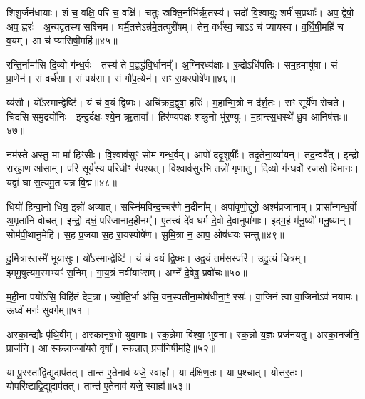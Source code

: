 शिशु॒र्जन॑धायाः। 
शं च॒ वक्षि॒ परि॑ च॒ वक्षि॑। 
चतुः॑ स्रक्ति॒र्नाभि॑र्\mbox{}ऋ॒तस्य॑। 
सदो॑ वि॒श्वायुः॒ शर्म॑ स॒प्रथाः᳚। 
अप॒ द्वेषो॒ अप॒ ह्वरः॑। 
अ॒न्यद्व्र॑तस्य सश्चिम। 
घर्मै॒तत्तेऽन्न॑मे॒तत्पुरी॑षम्। 
तेन॒ वर्ध॑स्व॒ चाऽऽ च॑ प्यायस्व। 
व॒र्धि॒षी॒महि॑ च व॒यम्। 
आ च॑ प्यासिषी॒महि॑॥४५॥

रन्ति॒र्नामा॑सि दि॒व्यो ग॑न्ध॒र्वः। 
तस्य॑ ते प॒द्वद्ध॑वि॒र्धानम्᳚। 
अ॒ग्निरध्य॑क्षाः। 
रु॒द्रोऽधि॑पतिः। 
सम॒हमायु॑षा। 
सं प्रा॒णेन॑। 
सं वर्च॑सा। 
सं पय॑सा। 
सं गौ॑प॒त्येन॑। 
सꣳ रा॒यस्पोषे॑ण॥४६॥

व्य॑सौ। 
यो᳚ऽस्मान्द्वेष्टि॑। 
यं च॑ व॒यं द्वि॒ष्मः। 
अचि॑क्रद॒द्वृषा॒ हरिः॑। 
म॒हान्मि॒त्रो न द॑र्\mbox{}श॒तः। 
सꣳ सूर्ये॑ण रोचते। 
चिद॑सि समु॒द्रयो॑निः। 
इन्दु॒र्दक्षः॑ श्ये॒न ऋ॒तावा᳚। 
हिर॑ण्यपक्षः  शकु॒नो भु॑र॒ण्युः। 
म॒हान्त्स॒धस्थे᳚ ध्रु॒व आनिष॑त्तः॥४७॥

नम॑स्ते अस्तु॒ मा मा॑ हिꣳसीः। 
वि॒श्वाव॑सुꣳ सोम गन्ध॒र्वम्। 
आपो॑ ददृ॒शुषीः᳚। 
तदृ॒तेना॒व्या॑यन्। 
तद॒न्ववै᳚त्। 
इन्द्रो॑ रारहा॒ण आ॑साम्। 
परि॒ सूर्य॑स्य परि॒धीꣳ र॑पश्यत्। 
वि॒श्वाव॑सुर॒भि तन्नो॑ गृणातु। 
दि॒व्यो ग॑न्ध॒र्वो रज॑सो वि॒मानः॑। 
यद्वा॑ घा स॒त्यमु॒त यन्न वि॒द्म॥४८॥

धियो॑ हिन्वा॒नो धिय॒ इन्नो॑ अव्यात्। 
सस्नि॑मविन्द॒च्चर॑णे न॒दीना᳚म्। 
अपा॑वृणो॒द्दुरो॒ अश्म॑व्रजानाम्। 
प्रासा᳚न्गन्ध॒र्वो अ॒मृता॑नि वोचत्। 
इन्द्रो॒ दक्षं॒ परि॑जानाद॒हीनम्᳚। 
ए॒तत्त्वं दे॑व घर्म दे॒वो दे॒वानुपा॑गाः। 
इ॒दम॒हं म॑नु॒ष्यो॑ मनु॒ष्यान्॑। 
सोम॑पी॒थानु॒मेहि॑। 
स॒ह प्र॒जया॑ स॒ह रा॒यस्पोषे॑ण। 
सु॒मि॒त्रा न॒ आप॒ ओष॑धयः सन्तु॥४९॥

दु॒र्मि॒त्रास्तस्मै॑ भूयासुः। 
यो᳚ऽस्मान्द्वेष्टि॑। 
यं च॑ व॒यं द्वि॒ष्मः। 
उद्व॒यं तम॑स॒स्परि॑। 
उदु॒त्यं चि॒त्रम्। 
इ॒ममू॒षुत्यम॒स्मभ्यꣳ॑ स॒निम्। 
गा॒य॒त्रं नवी॑याꣳसम्। 
अग्ने॑ दे॒वेषु॒ प्रवो॑चः॥५०॥
\anuvakamend[याऽऽग्नी᳚ध्रे॒ तान्त॑ ए॒तेनाव॑ यजे॒ स्वाहा॒ धर्म॑णा शं॒ युधा॑याः प्यासिषी॒महि॒ पोषे॑ण॒ निष॑त्तो वि॒द्म स॑न्त्व॒ष्टौ]

म॒ही॒नां पयो॑ऽसि॒ विहि॑तं देव॒त्रा। 
ज्यो॒ति॒र्भा अ॑सि॒ वन॒स्पती॑ना॒\-मोष॑धीना॒ꣳ॒ रसः॑। 
वा॒जिनं॑ त्वा वा॒जिनोऽव॑ नयामः। 
ऊ॒र्ध्वं मनः॑ सुव॒र्गम्॥५१॥
\anuvakamend

अस्का॒न्द्यौः पृ॑थि॒वीम्। 
अस्का॑नृष॒भो युवा॒गाः। 
स्क॒न्नेमा विश्वा॒ भुव॑ना। 
स्क॒न्नो य॒ज्ञः प्रज॑नयतु। 
अस्का॒नज॑नि॒ प्राज॑नि। 
आ स्क॒न्नाज्जा॑यते॒ वृषा᳚। 
स्क॒न्नात् प्रज॑निषीमहि॥५२॥
\anuvakamend

या पु॒रस्ता᳚द्वि॒द्युदाप॑तत्। 
तान्त॑ ए॒तेनाव॑ यजे॒ स्वाहा᳚। 
या द॑क्षिण॒तः। 
या प॒श्चात्। 
योत्त॑र॒तः। 
योपरि॑ष्टाद्वि॒द्युदाप॑तत्। 
तान्त॑ ए॒तेनाव॑ यजे॒ स्वाहा᳚॥५३॥
\anuvakamend

